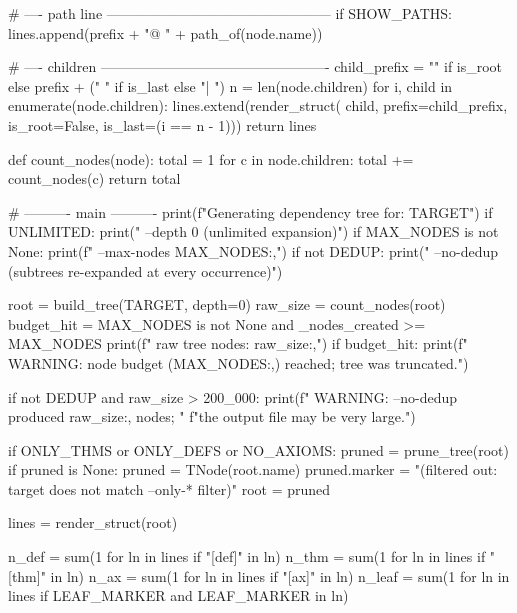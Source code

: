 \documentclass[11pt,reqno]{amsart}
\begin{document}
\begin{verbatimbox}
# ---- path line ------------------------------------------------
if SHOW_PATHS:
lines.append(prefix + "@ " + path_of(node.name))

# ---- children -------------------------------------------------
child_prefix = "" if is_root else prefix + ("    " if is_last else "|   ")
n = len(node.children)
for i, child in enumerate(node.children):
lines.extend(render_struct(
child, prefix=child_prefix, is_root=False,
is_last=(i == n - 1)))
return lines

def count_nodes(node):
total = 1
for c in node.children:
total += count_nodes(c)
return total

# ---------- main ----------
print(f"Generating dependency tree for: {TARGET}")
if UNLIMITED:
print("  --depth 0 (unlimited expansion)")
if MAX_NODES is not None:
print(f"  --max-nodes {MAX_NODES:,}")
if not DEDUP:
print("  --no-dedup (subtrees re-expanded at every occurrence)")

root = build_tree(TARGET, depth=0)
raw_size = count_nodes(root)
budget_hit = MAX_NODES is not None and _nodes_created >= MAX_NODES
print(f"  raw tree nodes: {raw_size:,}")
if budget_hit:
print(f"  WARNING: node budget ({MAX_NODES:,}) reached; tree was truncated.")

if not DEDUP and raw_size > 200_000:
print(f"  WARNING: --no-dedup produced {raw_size:,} nodes; "
f"the output file may be very large.")

if ONLY_THMS or ONLY_DEFS or NO_AXIOMS:
pruned = prune_tree(root)
if pruned is None:
pruned = TNode(root.name)
pruned.marker = "(filtered out: target does not match --only-* filter)"
root = pruned

lines = render_struct(root)

n_def = sum(1 for ln in lines if "[def]" in ln)
n_thm = sum(1 for ln in lines if "[thm]" in ln)
n_ax  = sum(1 for ln in lines if "[ax]"  in ln)
n_leaf = sum(1 for ln in lines if LEAF_MARKER and LEAF_MARKER in ln)


\end{verbatimbox}
\end{document}
